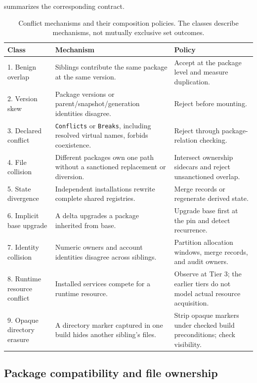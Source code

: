 summarizes the corresponding contract.
\begin{table}[tbp]
\centering\small
\begin{tabularx}{\textwidth}{@{}p{2.6cm}YY@{}}
\toprule
Class & Mechanism & Policy \\
\midrule
\num{1}. Benign overlap & Siblings contribute the same package at the same version. & Accept at the package level and measure duplication. \\
\num{2}. Version skew & Package versions or parent/snapshot/generation identities disagree. & Reject before mounting. \\
\num{3}. Declared conflict & \texttt{Conflicts} or \texttt{Breaks}, including resolved virtual names, forbids coexistence. & Reject through package-relation checking. \\
\num{4}. File collision & Different packages own one path without a sanctioned replacement or diversion. & Intersect ownership sidecars and reject unsanctioned overlap. \\
\num{5}. State divergence & Independent installations rewrite complete shared registries. & Merge records or regenerate derived state. \\
\num{6}. Implicit base upgrade & A delta upgrades a package inherited from base. & Upgrade base first at the pin and detect recurrence. \\
\num{7}. Identity collision & Numeric owners and account identities disagree across siblings. & Partition allocation windows, merge records, and audit owners. \\
\num{8}. Runtime resource conflict & Installed services compete for a runtime resource. & Observe at Tier \num{3}; the earlier tiers do not model actual resource acquisition. \\
\num{9}. Opaque directory erasure & A directory marker captured in one build hides another sibling's files. & Strip opaque markers under checked build preconditions; check visibility. \\
\bottomrule
\end{tabularx}
\caption{Conflict mechanisms and their composition policies. The classes describe mechanisms, not mutually exclusive set outcomes.}
\label{tab:taxonomy}
\end{table}


\subsection{Package compatibility and file ownership}

